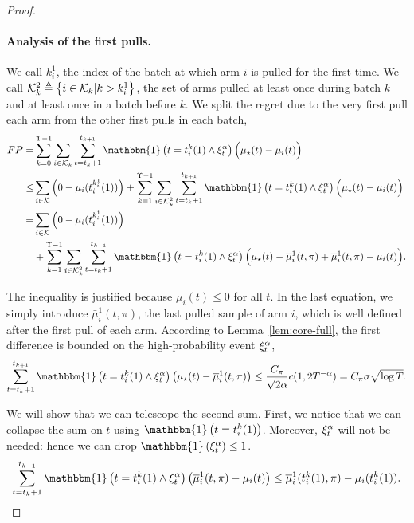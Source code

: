 \begin{proof}
\paragraph{Analysis of the first pulls.}

We call $k_i^1$, the index of the batch at which arm $i$ is pulled for the first time.  We call $\mathcal{K}_k^2 \triangleq \left\{ i \in \mathcal{K}_k | k > k_i^1\right\}$, the set of arms pulled at least once during batch $k$ and at least once in a batch before $k$. We split the regret due to the very first pull each arm from the other first pulls in each batch,
\begin{align*}
FP  = &\sum_{k=0}^{\Upsilon-1}\sum_{i\in\arms_k}\sum_{t=t_{k} +1 }^{t_{k+1}}  \mathbbm{1}\pa{ t = t_i^k(1) \land \HPevent}\Big(\mu_{\star}(t) - \mu_{i}(t)\Big)\\
\leq& \sum_{i \in \arms}  \Big(0- \mu_i(t_i^{k_i^1}(1))\Big) +  \sum_{k=1}^{\Upsilon -1} \sum_{i\in \arms_k^2}\sum_{t=t_k +1 }^{t_{k+1}}  \mathbbm{1}\pa{t = t_i^k(1) \land \HPevent}\Big(\mu_{\star}(t) - \mu_{i}(t)\Big)\\
 =& \sum_{i \in \arms} \Big(0- \mu_i(t_i^{k_i^1}(1))\Big) \\
& + \sum_{k=1}^{\Upsilon -1} \sum_{i\in \arms_k^2} \sum_{t=t_k +1 }^{t_{k+1}}  \mathbbm{1}\pa{ t = t_i^k(1) \land \HPevent}\Big(\mu_{\star}(t) - \bar{\mu}^1_i(t, \pi) + \bar{\mu}^1_i(t,\pi) - \mu_{i}(t)\Big).
\end{align*}

The inequality is justified because $\mu_i(t) \leq 0$ for all $t$. In the last equation, we simply introduce $\bar{\mu}^1_i(t,\pi)$, the last pulled sample of arm $i$, which is well defined after the first pull of each arm.
According to Lemma~\ref{lem:core-full}, the first difference is bounded on the high-probability event $\xi^\alpha_t$,
\begin{equation}
    \label{eq:fp_lemma1}
    \sum_{t=t_k +1 }^{t_{k+1}} \mathbbm{1}\pa{t = t_i^k(1) \land \HPevent}\pa{\mu_{\star}(t) - \bar{\mu}^1_i(t, \pi)} \leq \frac{C_\pi}{\sqrt{2\alpha}} c(1,2T^{-\alpha}) = C_{\pi} \sigma \sqrt{\log{T}}.
\end{equation}


We will show that we can telescope the second sum. First, we notice that we can collapse the sum on $t$ using $ \mathbbm{1}\pa{t = t_i^k(1)}$. Moreover, $\xi^\alpha_t$ will not be needed: hence we can drop $\mathbbm{1}\pa{\HPevent} \leq 1 $.
\begin{equation}
\label{eq:fp_collapse}
 \sum_{t=t_k +1 }^{t_{k+1}} \mathbbm{1}\pa{ t = t_i^k(1) \land \HPevent}\pa{\bar{\mu}^1_i(t,\pi) - \mu_{i}(t)} \leq \bar{\mu}^1_i(t_i^k(1), \pi) - \mu_{i}(t_i^k(1)).
\end{equation}


\end{proof}
